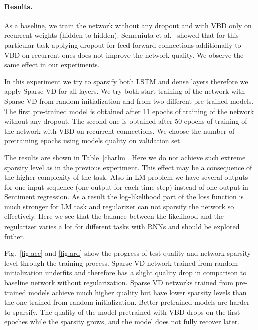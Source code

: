 \documentclass{article}
\begin{document}
\paragraph{Results.}

As a baseline, we train the network without any dropout and with VBD only on recurrent weights (hidden-to-hidden). Semeniuta et al.~ showed that for this particular task applying dropout for feed-forward connections additionally to VBD on recurrent ones does not improve the network quality. We observe the same effect in our experiments.

In this experiment we try to sparsify both LSTM and dense layers therefore we apply Sparse VD for all layers. We try both start training of the network with Sparse VD from random initialization and from two different pre-trained models. The first pre-trained model is obtained after 11 epochs of training of the network without any dropout. The second one is obtained after 50 epochs of training of the network with VBD on recurrent connections. We choose the number of pretraining epochs using models quality on validation set.

The results are shown in Table~\ref{charlm}. Here we do not achieve such extreme sparsity level as in the previous experiment. 
This effect may be a consequence 
of the higher complexity of the task. Also in LM problem we have several outputs for one input sequence (one output for each time step) instead of one output in Sentiment regression. As a result the log-likelihood part of the loss function is much stronger for LM task and regularizer can not sparsify the network so effectively.
Here we see that the balance between the likelihood and the regularizer varies a lot for different tasks with RNNs and should be explored futher. 

Fig.~\ref{fig:acc} and \ref{fig:ard} show the progress of test quality and network sparsity level through the training process. 
Sparse VD network trained from random initialization underfits and therefore has a slight quality drop in comparison to baseline network without regularization. 
Sparse VD networks trained from pre-trained models achieve much higher quality but have lower sparsity levels than the one trained from random initialization.
Better pretrained models are harder to sparsify. The quality of the model pretrained with VBD drops on the first epoches while the sparsity grows, and the model does not fully recover later.
\end{document}
